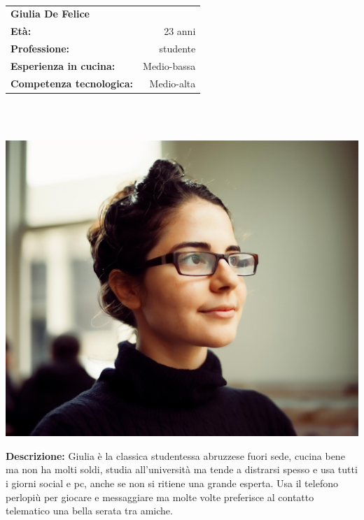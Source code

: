 \hrulefill\\
\begin{minipage}{.75\textwidth}
\begin{tabular}{l | r}
	\textbf{Giulia De Felice} & \\
	\textbf{Età:} & 23 anni\\
	\textbf{Professione:} & studente\\
	\textbf{Esperienza in cucina:} & Medio-bassa\\
	\textbf{Competenza tecnologica:} & Medio-alta\\
\end{tabular}\\\\
\end{minipage}
\begin{minipage}{.24\textwidth}
	\includegraphics[width=\textwidth]{img/personas/giulia}
\end{minipage}
	\textbf{Descrizione:}  Giulia è la classica studentessa abruzzese fuori
	sede, cucina bene ma non ha molti soldi, studia all'università ma tende
	a distrarsi spesso e usa tutti i giorni social e pc, anche se non si
	ritiene una grande esperta.  Usa il telefono perlopiù per giocare e
	messaggiare ma molte volte preferisce al contatto telematico una bella
	serata tra amiche.\\

